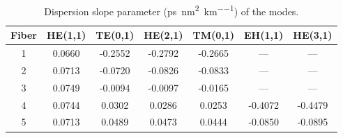 \begin{table}[!t]
\caption[]{Dispersion slope parameter (\si{\ps \per \square\nm \per \km}) of the modes.}
\label{tab:fiberS}
\centering
\begin{tabular}{ccccccc}
Fiber & HE(1,1) & TE(0,1) & HE(2,1) & TM(0,1) & EH(1,1) & HE(3,1) \\
\hline
1 & 0.0660 & -0.2552 & -0.2792 & -0.2665 & --- & --- \\
2 & 0.0713 & -0.0720 & -0.0826 & -0.0833 & --- & --- \\
3 & 0.0749 & -0.0094 & -0.0097 & -0.0165 & --- & --- \\
4 & 0.0744 & 0.0302 & 0.0286 & 0.0253 & -0.4072 & -0.4479 \\
5 & 0.0713 & 0.0489 & 0.0473 & 0.0444 & -0.0850 & -0.0895 \\
\hline
\end{tabular}
\end{table}
